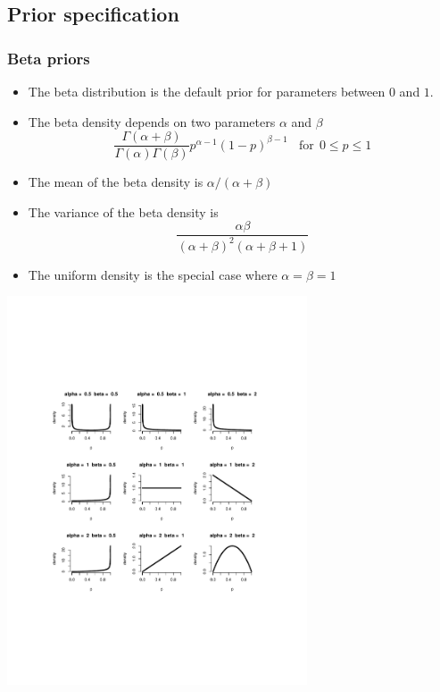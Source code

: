 \documentclass[aspectratio=169]{beamer}
\begin{document}
\subsection{Prior specification}
\begin{frame}\frametitle{Beta priors}
\begin{itemize}
\item The beta distribution is the default prior
  for parameters between $0$ and $1$.
\item The beta density depends on two parameters $\alpha$ and $\beta$
$$
\frac{\Gamma(\alpha +  \beta)}{\Gamma(\alpha)\Gamma(\beta)}
 p ^ {\alpha - 1} (1 - p) ^ {\beta - 1} ~~~~\mbox{for} ~~ 0 \leq p \leq 1
$$
\item The mean of the beta density is $\alpha / (\alpha + \beta)$
\item The variance of the beta density is \
$$\frac{\alpha \beta}{(\alpha + \beta)^2 (\alpha + \beta + 1)}$$
\item The uniform density is the special case where $\alpha = \beta = 1$
\end{itemize}
\end{frame}

\begin{frame}
\includegraphics[width=3.5in]{beta.pdf}
\end{frame}
\end{document}
